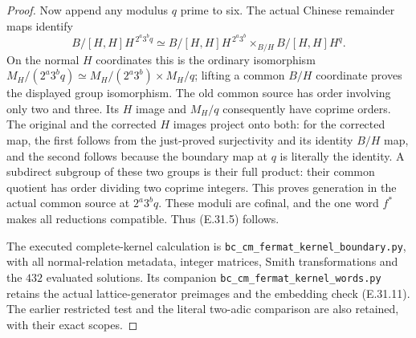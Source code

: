 \begin{proof}
Now append any modulus $q$ prime to six.
The actual Chinese remainder maps identify
\[
 B/[H,H]H^{\,2^a3^bq}
   \simeq
 B/[H,H]H^{\,2^a3^b}
       \mathbin{\times_{B/H}} B/[H,H]H^q.
 \tag{E.31.16}
\]
On the normal $H$ coordinates this is the
ordinary isomorphism
$M_H/(2^a3^bq)\simeq
M_H/(2^a3^b)\times M_H/q$;
lifting a common $B/H$ coordinate proves
the displayed group isomorphism.
The old common source has order involving
only two and three.  Its $H$ image and
$M_H/q$ consequently have coprime orders.
The original and the corrected $H$ images
project onto both: for the corrected map,
the first follows from the just-proved
surjectivity and its identity $B/H$ map,
and the second follows because the
boundary map at $q$ is literally the
identity.  A subdirect subgroup of these
two groups is their full product: their
common quotient has order dividing two
coprime integers.  This proves generation
in the actual common source at
$2^a3^bq$.  These moduli are cofinal, and
the one word $f^\ast$ makes all reductions
compatible.  Thus (E.31.5) follows.

The executed complete-kernel calculation is
\texttt{bc\_cm\_fermat\_kernel\_boundary.py},
with all normal-relation metadata, integer
matrices, Smith transformations and the
$432$ evaluated solutions.  Its companion
\texttt{bc\_cm\_fermat\_kernel\_words.py}
retains the actual lattice-generator
preimages and the embedding check
(E.31.11).  The earlier restricted test
and the literal two-adic comparison are
also retained, with their exact scopes.
\end{proof}
